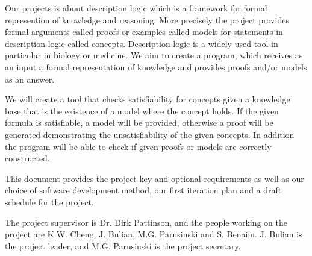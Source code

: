 Our projects is about description logic which is a framework for formal represention of knowledge and reasoning. More precisely the project provides formal arguments called proofs or examples called models for statements in description logic called concepts. Description logic is a widely used tool in particular in biology or medicine. We aim to create a program,
which receives as an input a formal representation of knowledge and provides proofs and/or models as an answer. 

We will create a tool that checks satisfiability for concepts given a knowledge base that is the existence of a model where the concept holds. If the given formula is satisfiable, a model will be provided, otherwise a proof will be generated demonstrating the unsatisfiability of the given concepts. In addition the program will be able to check if given proofs or models are correctly constructed.

This document provides the project key and optional requirements as well as our choice of software development method, our first iteration plan and a draft schedule for the project.

The project supervisor is Dr. Dirk Pattinson, and the people working on the project
are K.W. Cheng, J. Bulian, M.G. Parusinski and S. Benaim. J. Bulian is the project leader, and M.G. Parusinski is the project secretary.
